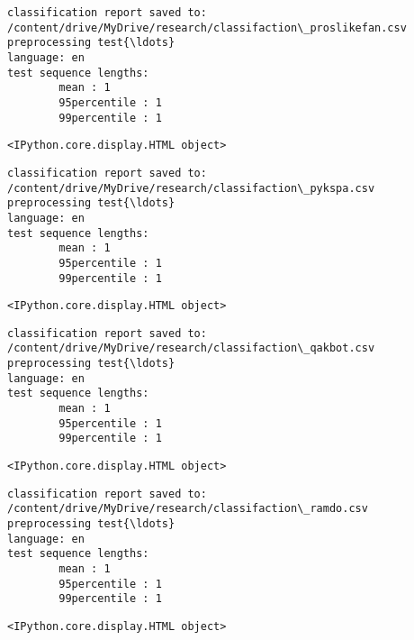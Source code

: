 \documentclass[11pt]{article}
\begin{document}
    
    \begin{Verbatim}[commandchars=\\\{\}]
classification report saved to:
/content/drive/MyDrive/research/classifaction\_proslikefan.csv
preprocessing test{\ldots}
language: en
test sequence lengths:
        mean : 1
        95percentile : 1
        99percentile : 1
    \end{Verbatim}

    
    \begin{Verbatim}[commandchars=\\\{\}]
<IPython.core.display.HTML object>
    \end{Verbatim}

    
    \begin{Verbatim}[commandchars=\\\{\}]
classification report saved to:
/content/drive/MyDrive/research/classifaction\_pykspa.csv
preprocessing test{\ldots}
language: en
test sequence lengths:
        mean : 1
        95percentile : 1
        99percentile : 1
    \end{Verbatim}

    
    \begin{Verbatim}[commandchars=\\\{\}]
<IPython.core.display.HTML object>
    \end{Verbatim}

    
    \begin{Verbatim}[commandchars=\\\{\}]
classification report saved to:
/content/drive/MyDrive/research/classifaction\_qakbot.csv
preprocessing test{\ldots}
language: en
test sequence lengths:
        mean : 1
        95percentile : 1
        99percentile : 1
    \end{Verbatim}

    
    \begin{Verbatim}[commandchars=\\\{\}]
<IPython.core.display.HTML object>
    \end{Verbatim}

    
    \begin{Verbatim}[commandchars=\\\{\}]
classification report saved to:
/content/drive/MyDrive/research/classifaction\_ramdo.csv
preprocessing test{\ldots}
language: en
test sequence lengths:
        mean : 1
        95percentile : 1
        99percentile : 1
    \end{Verbatim}

    
    \begin{Verbatim}[commandchars=\\\{\}]
<IPython.core.display.HTML object>
    \end{Verbatim}
\end{document}

